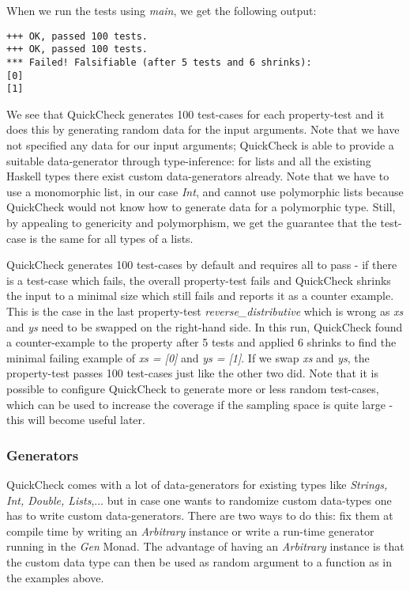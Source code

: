 When we run the tests using \textit{main}, we get the following output:

\begin{verbatim}
+++ OK, passed 100 tests.
+++ OK, passed 100 tests.
*** Failed! Falsifiable (after 5 tests and 6 shrinks):    
[0]
[1]
\end{verbatim}

We see that QuickCheck generates 100 test-cases for each property-test and it does this by generating random data for the input arguments. Note that we have not specified any data for our input arguments; QuickCheck is able to provide a suitable data-generator through type-inference: for lists and all the existing Haskell types there exist custom data-generators already. Note that we have to use a monomorphic list, in our case \textit{Int}, and cannot use polymorphic lists because QuickCheck would not know how to generate data for a polymorphic type. Still, by appealing to genericity and polymorphism, we get the guarantee that the test-case is the same for all types of a lists.

QuickCheck generates 100 test-cases by default and requires all to pass - if there is a test-case which fails, the overall property-test fails and QuickCheck shrinks the input to a minimal size which still fails and reports it as a counter example. This is the case in the last property-test \textit{reverse\_distributive} which is wrong as \textit{xs} and \textit{ys} need to be swapped on the right-hand side. In this run, QuickCheck found a counter-example to the property after 5 tests and applied 6 shrinks to find the minimal failing example of \textit{xs = [0]} and \textit{ys = [1]}. If we swap \textit{xs} and \textit{ys}, the property-test passes 100 test-cases just like the other two did. Note that it is possible to configure QuickCheck to generate more or less random test-cases, which can be used to increase the coverage if the sampling space is quite large - this will become useful later.

\subsubsection*{Generators}
QuickCheck comes with a lot of data-generators for existing types like \textit{Strings, Int, Double, Lists},... but in case one wants to randomize custom data-types one has to write custom data-generators. There are two ways to do this: fix them at compile time by writing an \textit{Arbitrary} instance or write a run-time generator running in the \textit{Gen} Monad. The advantage of having an \textit{Arbitrary} instance is that the custom data type can then be used as random argument to a function as in the examples above.

